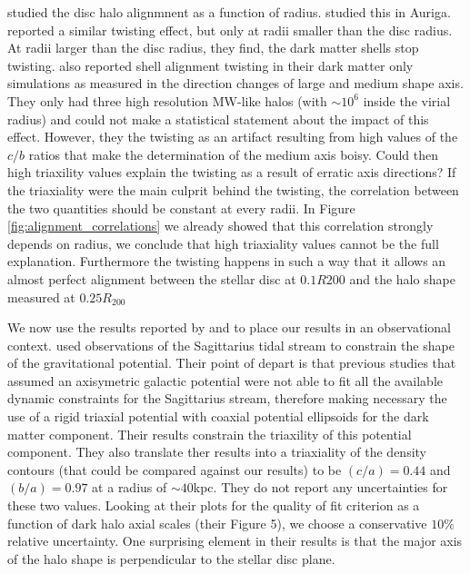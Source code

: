 \documentclass[usenatbib]{mnras}
\begin{document}
\cite{Bailin05} studied the disc halo alignmnent as a function of
radius.
\cite{Gomez17} studied this in Auriga.
\cite{Debattista13} reported a similar twisting effect, but only at radii smaller
than the disc radius. 
At radii larger than the disc radius, they find, the dark matter
shells stop twisting. 
\cite{JingSuto02} also reported shell alignment twisting in their dark
matter only simulations as measured in the direction changes of large
and medium shape axis. 
They only had three high resolution MW-like halos (with
$\sim 10^{6}$ inside the virial radius) and could not make a
statistical statement about the impact of this effect.
However, they the twisting as an artifact resulting from high values of the
$c/b$ ratios that make the determination of the medium axis boisy.
Could then high triaxility values explain the twisting as a result of
erratic axis directions? 
If the triaxiality were the main culprit behind the twisting, the
correlation between the two quantities should be constant at every
radii.
In Figure \ref{fig:alignment_correlations} we already showed that this
correlation strongly depends on radius, we conclude that high
triaxiality values cannot be the full explanation.
Furthermore the twisting happens in such a way that it allows an
almost perfect alignment between the stellar disc at $0.1R{200}$ and
the halo shape measured at $0.25R_{200}$ 

We now use the results reported by \cite{LM10} and \cite{Bovy16}
to place our results in an observational context.
\cite{LM10} used observations of the Sagittarius tidal stream to
constrain the shape of the gravitational potential.
Their point of depart is that previous studies that assumed an
axisymetric galactic potential were not able to fit all the available
dynamic constraints for the Sagittarius stream, therefore making
necessary the use of a rigid triaxial potential with coaxial potential
ellipsoids for the dark matter component.  
Their results constrain the triaxility of this potential
component. 
They also translate ther results into a triaxiality of the density
contours (that could be compared against our results)
 to be $(c/a)=0.44$ and $(b/a)=0.97$ at a radius of $\sim 40$kpc. 
They do not report any uncertainties for these two values. 
Looking at their plots for the quality of fit criterion as a function
of dark halo axial scales (their Figure 5), we choose a conservative $10\%$
relative uncertainty.
One surprising element in their results is that  the major axis of the
halo shape is perpendicular to the stellar disc plane.  
\end{document}
